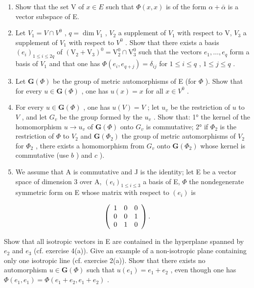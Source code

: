\begin{enumerate}
\def\labelenumi{\alph{enumi})}
\item
  Show that the set V of \(x \in E\) such that \(\Phi(x, x)\) is of the form \(\alpha + \bar{\alpha}\) is a vector subspace of E.
\item
  Let \(V_{1}=V\cap V^{0}\) , \(q=\dim V_{1}\) , \(V_{2}\) a supplement of \(V_{1}\) with respect to V, \(V_{3}\) a supplement of \(V_{1}\) with respect to \(V^{0}\) . Show that there exists a basis \((e_{i})_{1\leqslant i\leqslant2q}\) of \((\mathrm{V}_{2}+\mathrm{V}_{3})^{0}=\mathrm{V}_{2}^{0}\cap\mathrm{V}_{3}^{0}\) such that the vectors \(e_1, \ldots, e_q\) form a basis of \(V_1\) and that one has \(\Phi(e_i, e_{q+j}) = \delta_{ij}\) for \(1 \leqslant i \leqslant q\) , \(1 \leqslant j \leqslant q\) .
\item
  Let \(\mathbf{G}(\Phi)\) be the group of metric automorphisms of E (for \(\Phi\) ). Show that for every \(u \in \mathbf{G}(\Phi)\) , one has \(u(x) = x\) for all \(x \in V^0\) .
\item
  For every \(u \in \mathbf{G}(\Phi)\) , one has \(u(V) = V\) ; let \(u_{v}\) be the restriction of \(u\) to \(V\) , and let \(G_{v}\) be the group formed by the \(u_{v}\) . Show that: 1° the kernel of the homomorphism \(u \to u_{v}\) of \(\mathbf{G}(\Phi)\) onto \(G_{v}\) is commutative; 2° if \(\Phi_{2}\) is the restriction of \(\Phi\) to \(V_{2}\) and \(\mathbf{G}(\Phi_{2})\) the group of metric automorphisms of \(V_{2}\) for \(\Phi_{2}\) , there exists a homomorphism from \(G_{v}\) onto \(\mathbf{G}(\Phi_{2})\) whose kernel is commutative (use \(b\) ) and \(c\) ).
\item
  We assume that A is commutative and J is the identity; let E be a vector space of dimension 3 over A, \((e_{i})_{1\leqslant i\leqslant3}\) a basis of E, \(\Phi\) the nondegenerate symmetric form on E whose matrix with respect to \((e_{i})\) is
\end{enumerate}

\[
\left( \begin{array}{c c c} 1 & 0 & 0 \\ 0 & 0 & 1 \\ 0 & 1 & 0 \end{array} \right).
\]

Show that all isotropic vectors in E are contained in the hyperplane spanned by \(e_{2}\) and \(e_{3}\) (cf. exercise 4(a)). Give an example of a non-isotropic plane containing only one isotropic line (cf. exercise 2(a)). Show that there exists no automorphism \(u \in \mathbf{G}(\Phi)\) such that \(u(e_{1}) = e_{1} + e_{2}\) , even though one has \(\Phi(e_{1}, e_{1}) = \Phi(e_{1} + e_{2}, e_{1} + e_{2})\) .


